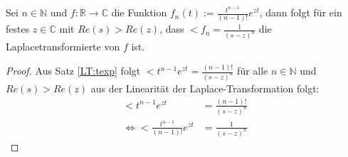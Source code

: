 \begin{satz}
\label{LT:texpn}Sei $n \in \mathbb{N}$ und $f: \mathbb{R} \rightarrow \mathbb{C}$ die Funktion $f_n(t) := \frac{t^{n-1}}{(n-1)!} e^{zt}$, dann folgt für ein festes $z \in \mathbb{C}$ mit $Re(s) > Re(z)$, dass $\lt{f_n} = \frac{1}{(s-z)^{n}}$ die Laplacetransformierte von $f$ ist.
\begin{proof}
Aus Satz \ref{LT:texp} folgt $\lt{t^{n-1} e^{zt}} = \frac{(n-1)!}{(s-z)^n}$ für alle $n \in \mathbb{N}$ und $Re(s) > Re(z)$  aus der Linearität der Laplace-Transformation folgt:
\begin{align}
	\lt{t^{n-1} e^{zt}} &= \frac{(n-1)!}{(s-z)^n} \\
	\Leftrightarrow \lt{\frac{t^{n-1}}{(n-1)!} e^{zt}} &= \frac{1}{(s-z)^n}
\end{align}
\end{proof}
\end{satz}